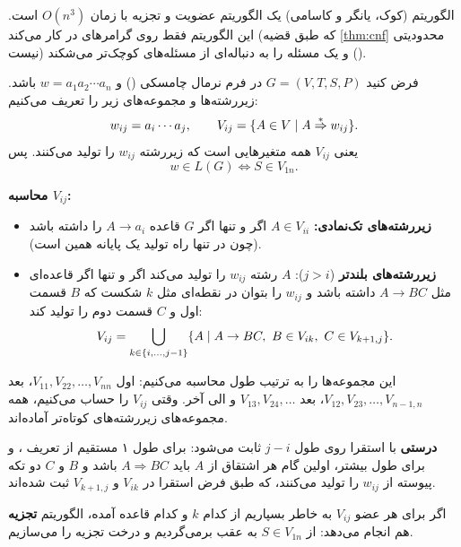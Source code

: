 الگوریتم  (کوک، یانگر و کاسامی) یک الگوریتم عضویت و تجزیه با زمان $O(n^3)$ است. این الگوریتم فقط روی گرامرهای در  کار می‌کند (که طبق قضیه \ref{thm:cnf} محدودیتی نیست) و یک مسئله را به دنباله‌ای از مسئله‌های کوچک‌تر می‌شکند ().

فرض کنید $G=(V,T,S,P)$ در فرم نرمال چامسکی () و $w=a_1a_2\cdots a_n$ باشد. زیررشته‌ها و مجموعه‌های زیر را تعریف می‌کنیم:
\[w_{ij}=a_i\cdots a_j,\qquad V_{ij}=\{A\in V\mid A\overset{*}{\Rightarrow} w_{ij}\}.\]
یعنی $V_{ij}$ همه متغیرهایی است که زیررشته $w_{ij}$ را تولید می‌کنند. پس
\[w\in L(G)\iff S\in V_{1n}.\]

\textbf{محاسبه $V_{ij}$:}
\begin{itemize}
\item \textbf{زیررشته‌های تک‌نمادی:} $A\in V_{ii}$ اگر و تنها اگر $G$ قاعده $A\to a_i$ را داشته باشد (چون در  تنها راه تولید یک پایانه همین است).
\item \textbf{زیررشته‌های بلندتر} ($j>i$): $A$ رشته $w_{ij}$ را تولید می‌کند اگر و تنها اگر قاعده‌ای مثل $A\to BC$ داشته باشد و $w_{ij}$ را بتوان در نقطه‌ای مثل $k$ شکست که $B$ قسمت اول و $C$ قسمت دوم را تولید کند:
\[V_{ij}=\bigcup_{k\in\{i,\dots,j-1\}}\{A\mid A\to BC,\ B\in V_{ik},\ C\in V_{k+1,j}\}.\]
\end{itemize}
این مجموعه‌ها را به ترتیب طول محاسبه می‌کنیم: اول $V_{11},V_{22},\dots,V_{nn}$، بعد $V_{12},V_{23},\dots,V_{n-1,n}$، بعد $V_{13},V_{24},\dots$ و الی آخر. وقتی $V_{ij}$ را حساب می‌کنیم، همه مجموعه‌های زیررشته‌های کوتاه‌تر آماده‌اند.

\textbf{درستی} با استقرا روی طول $j-i$ ثابت می‌شود: برای طول ۱ مستقیم از تعریف ، و برای طول بیشتر، اولین گام هر اشتقاق از $A$ باید $A\Rightarrow BC$ باشد و $B$ و $C$ دو تکه پیوسته از $w_{ij}$ را تولید می‌کنند، که طبق فرض استقرا در $V_{ik}$ و $V_{k+1,j}$ ثبت شده‌اند.

اگر برای هر عضو $V_{ij}$ به خاطر بسپاریم از کدام $k$ و کدام قاعده آمده، الگوریتم \textbf{تجزیه} هم انجام می‌دهد: از $S\in V_{1n}$ به عقب برمی‌گردیم و درخت تجزیه را می‌سازیم.

